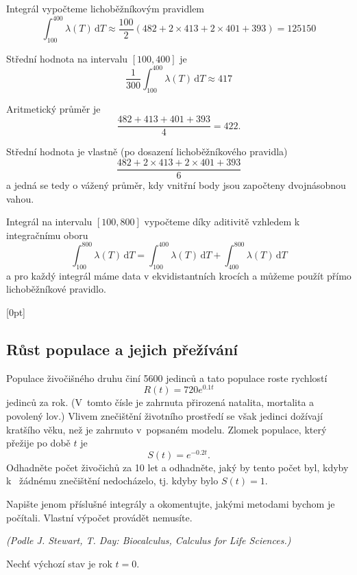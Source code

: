 \reseni

Integrál vypočteme lichoběžníkovým pravidlem
$$\int_{100}^{400}\lambda(T)\,\mathrm dT\approx
\frac {100}2(482+2\times 413+2\times401+393)=125150$$

Střední hodnota na intervalu $[100,400]$ je
$$\frac{1}{300}\int_{100}^{400}\lambda(T)\,\mathrm dT \approx 417$$

Aritmetický průměr je
$$\frac{482+413+401+393}4=422.$$

Střední hodnota je vlastně (po dosazení lichoběžníkového pravidla)
$$\frac {482+2\times 413+2\times401+393}6$$
a jedná se tedy o vážený průměr, kdy vnitřní body jsou započteny dvojnásobnou vahou.


Integrál na intervalu $[100,800]$ vypočteme díky aditivitě vzhledem k
integračnímu oboru
$$\int_{100}^{800}\lambda(T)\,\mathrm dT=\int_{100}^{400}\lambda(T)\,\mathrm dT+\int_{400}^{800}\lambda(T)\,\mathrm dT$$
a pro každý integrál máme data v ekvidistantních krocích a můžeme
použít přímo lichoběžníkové pravidlo.
\konec

\stranka





[0pt]

\def\mezera{\vspace*{10pt}}

\subsection{Růst populace a jejich přežívání}  Populace živočišného druhu
činí 5600 jedinců a tato populace roste rychlostí
$$R(t)=720 e^{0.1t}$$ jedinců za rok. (V tomto čísle je zahrnuta
přirozená natalita, mortalita a povolený lov.) Vlivem znečištění
životního prostředí se však jedinci dožívají kratšího věku, než je
zahrnuto v popsaném modelu. Zlomek populace, který přežije po době $t$
je $$S(t)=e^{-0.2t}.$$ Odhadněte počet živočichů za 10 let a
odhadněte, jaký by tento počet byl, kdyby k~ žádnému znečištění
nedocházelo, tj. kdyby bylo $S(t)=1$.

Napište jenom příslušné integrály a okomentujte, jakými metodami
bychom je počítali. Vlastní výpočet provádět nemusíte.

\textit{(Podle J. Stewart, T. Day: Biocalculus,  Calculus for Life Sciences.)}

\reseni
Nechť výchozí stav je rok $t=0$.

